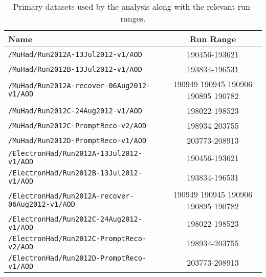 \begin{table}[hbt]
\begin{center}
\tiny{
	\begin{tabular}{lc}\hline
		Name                                                  & Run Range                          \\ \hline
		\verb=/MuHad/Run2012A-13Jul2012-v1/AOD=               & 190456-193621                      \\ 
		\verb=/MuHad/Run2012B-13Jul2012-v1/AOD=               & 193834-196531                      \\ 
		\verb=/MuHad/Run2012A-recover-06Aug2012-v1/AOD=       & 190949 190945 190906 190895 190782 \\ 
		\verb=/MuHad/Run2012C-24Aug2012-v1/AOD=               & 198022-198523                      \\ 
		\verb=/MuHad/Run2012C-PromptReco-v2/AOD=              & 198934-203755                      \\ 
		\verb=/MuHad/Run2012D-PromptReco-v1/AOD=              & 203773-208913                      \\ 
		\verb=/ElectronHad/Run2012A-13Jul2012-v1/AOD=         & 190456-193621                      \\ 
		\verb=/ElectronHad/Run2012B-13Jul2012-v1/AOD=         & 193834-196531                      \\ 
		\verb=/ElectronHad/Run2012A-recover-06Aug2012-v1/AOD= & 190949 190945 190906 190895 190782 \\ 
		\verb=/ElectronHad/Run2012C-24Aug2012-v1/AOD=         & 198022-198523                      \\ 
		\verb=/ElectronHad/Run2012C-PromptReco-v2/AOD=        & 198934-203755                      \\ 
		\verb=/ElectronHad/Run2012D-PromptReco-v1/AOD=        & 203773-208913                      \\ 
		\hline\hline
		\end{tabular}
}
\caption{\label{tab:evtsel_datasets_lpt}
    Primary datasets used by the \lpt analysis along with the relevant run-ranges.
}
\end{center}
\end{table}

